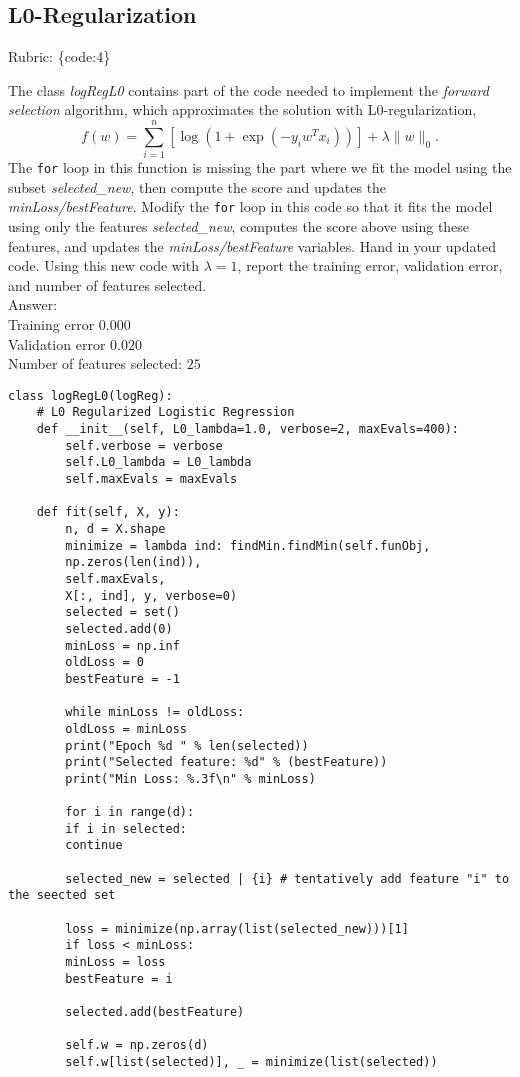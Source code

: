 \documentclass{article}
\def\rubric#1{\gre{Rubric: \{#1\}}}{}
\def\blu#1{{\color{blu}#1}}
\def\gre#1{{\color{gre}#1}}
\def\norm#1{\|#1\|}
\def\ans#1{\gre{Answer: #1}}{}
\begin{document}
\subsection{L0-Regularization}
\rubric{code:4}

The class \emph{logRegL0} contains part of the code needed to implement the \emph{forward selection} algorithm,
which approximates the solution with L0-regularization,
\[
f(w) =  \sum_{i=1}^n \left[\log(1+\exp(-y_iw^Tx_i))\right] + \lambda\norm{w}_0.
\]
The \texttt{for} loop in this function is missing the part where we fit the model using the subset \emph{selected\_new},
then compute the score and updates the \emph{minLoss/bestFeature}.
Modify the \texttt{for} loop in this code so that it fits the model using only
the features \emph{selected\_new}, computes the score above using these features,
and updates the \emph{minLoss/bestFeature} variables.
\blu{Hand in your updated code. Using this new code with $\lambda=1$,
report the training error, validation error, and number of features selected.}
\\\ans{
	\\Training error $0.000$
	\\Validation error $0.020$
	\\Number of features selected: $25$
}
\begin{lstlisting}[style=base]
class logRegL0(logReg):
	# L0 Regularized Logistic Regression
	def __init__(self, L0_lambda=1.0, verbose=2, maxEvals=400):
		self.verbose = verbose
		self.L0_lambda = L0_lambda
		self.maxEvals = maxEvals
	
	def fit(self, X, y):
		n, d = X.shape
		minimize = lambda ind: findMin.findMin(self.funObj,
		np.zeros(len(ind)),
		self.maxEvals,
		X[:, ind], y, verbose=0)
		selected = set()
		selected.add(0)
		minLoss = np.inf
		oldLoss = 0
		bestFeature = -1
		
		while minLoss != oldLoss:
		oldLoss = minLoss
		print("Epoch %d " % len(selected))
		print("Selected feature: %d" % (bestFeature))
		print("Min Loss: %.3f\n" % minLoss)
		
		for i in range(d):
		if i in selected:
		continue
		
		selected_new = selected | {i} # tentatively add feature "i" to the seected set
		
		loss = minimize(np.array(list(selected_new)))[1]
		if loss < minLoss:
		minLoss = loss
		bestFeature = i
		
		selected.add(bestFeature)
		
		self.w = np.zeros(d)
		self.w[list(selected)], _ = minimize(list(selected))

\end{lstlisting}
\end{document}
